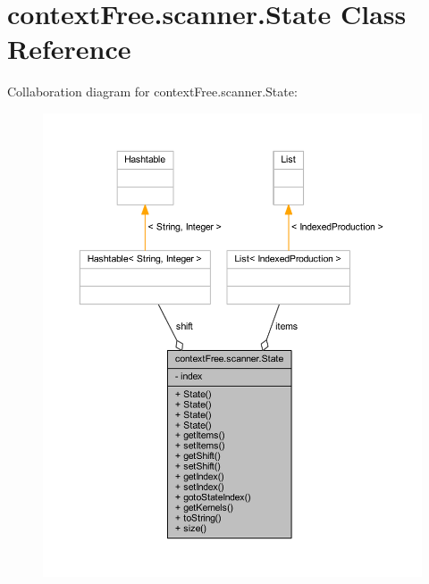 \hypertarget{classcontext_free_1_1scanner_1_1_state}{\section{context\-Free.\-scanner.\-State Class Reference}
\label{classcontext_free_1_1scanner_1_1_state}
}


Collaboration diagram for context\-Free.\-scanner.\-State\-:\nopagebreak
\begin{figure}[H]
\begin{center}
\leavevmode
\includegraphics[width=350pt]{classcontext_free_1_1scanner_1_1_state__coll__graph}
\end{center}
\end{figure}
